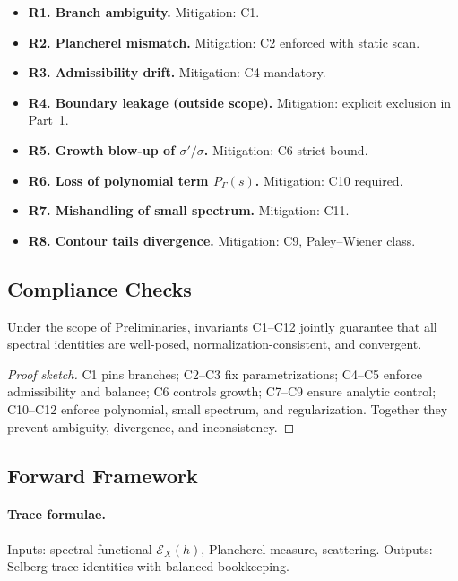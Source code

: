 \begin{itemize}
  \item \textbf{R1. Branch ambiguity.}  
  Mitigation: C1.
  \item \textbf{R2. Plancherel mismatch.}  
  Mitigation: C2 enforced with static scan.
  \item \textbf{R3. Admissibility drift.}  
  Mitigation: C4 mandatory.
  \item \textbf{R4. Boundary leakage (outside scope).}  
  Mitigation: explicit exclusion in Part~1.
  \item \textbf{R5. Growth blow-up of $\sigma'/\sigma$.}  
  Mitigation: C6 strict bound.
  \item \textbf{R6. Loss of polynomial term $P_\Gamma(s)$.}  
  Mitigation: C10 required.
  \item \textbf{R7. Mishandling of small spectrum.}  
  Mitigation: C11.
  \item \textbf{R8. Contour tails divergence.}  
  Mitigation: C9, Paley–Wiener class.
\end{itemize}


\subsection{Compliance Checks}

\begin{lemma}
Under the scope of Preliminaries, invariants C1–C12 jointly guarantee that all spectral identities are well-posed, normalization-consistent, and convergent.
\end{lemma}

\begin{proof}[Proof sketch]
C1 pins branches; C2–C3 fix parametrizations; C4–C5 enforce admissibility and balance; C6 controls growth; C7–C9 ensure analytic control; C10–C12 enforce polynomial, small spectrum, and regularization. Together they prevent ambiguity, divergence, and inconsistency.
\end{proof}


\subsection{Forward Framework}

\paragraph{Trace formulae.}  
Inputs: spectral functional $\mathcal{E}_X(h)$, Plancherel measure, scattering.  
Outputs: Selberg trace identities with balanced bookkeeping.

